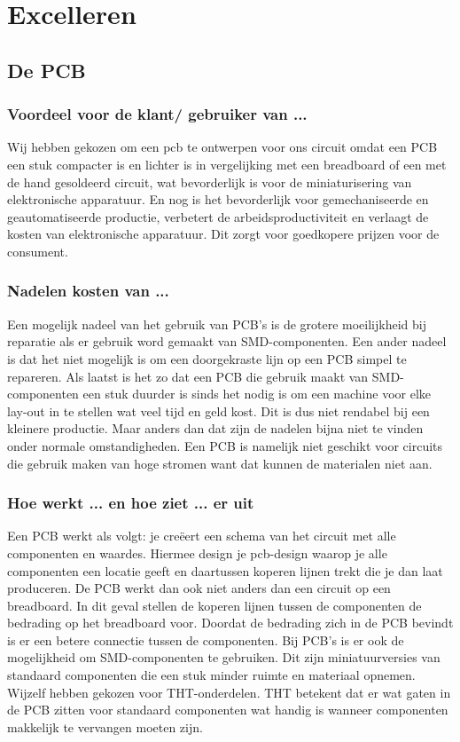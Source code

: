 \section{Excelleren}
\subsection{De PCB}
\subsubsection{Voordeel voor de klant/ gebruiker van ...}
Wij hebben gekozen om een pcb te ontwerpen voor ons circuit omdat een PCB een stuk compacter is en lichter is in vergelijking met een breadboard of een met de hand gesoldeerd circuit, wat bevorderlijk is voor de miniaturisering van elektronische apparatuur. En nog is het bevorderlijk voor gemechaniseerde en geautomatiseerde productie, verbetert de arbeidsproductiviteit en verlaagt de kosten van elektronische apparatuur. Dit zorgt voor goedkopere prijzen voor de consument.  

\subsubsection{Nadelen kosten van ...}
Een mogelijk nadeel van het gebruik van PCB's is de grotere moeilijkheid bij reparatie als er gebruik word gemaakt van SMD-componenten. Een ander nadeel is dat het niet mogelijk is om een doorgekraste lijn op een PCB simpel te repareren. Als laatst is het zo dat een PCB die gebruik maakt van SMD-componenten een stuk duurder is sinds het nodig is om een machine voor elke lay-out in te stellen wat veel tijd en geld kost. Dit is dus niet rendabel bij een kleinere productie. Maar anders dan dat zijn de nadelen bijna niet te vinden onder normale omstandigheden. Een PCB is namelijk niet geschikt voor circuits die gebruik maken van hoge stromen want dat kunnen de materialen niet aan. 



\subsubsection{Hoe werkt ... en hoe ziet ... er uit}
Een PCB werkt als volgt: je creëert een schema van het circuit met alle componenten en waardes. Hiermee design je pcb-design waarop je alle componenten een locatie geeft en daartussen koperen lijnen trekt die je dan laat produceren. De PCB werkt dan ook niet anders dan een circuit op een breadboard. In dit geval stellen de koperen lijnen tussen de componenten de bedrading op het breadboard voor. Doordat de bedrading zich in de PCB bevindt is er een betere connectie tussen de componenten.  Bij PCB's is er ook de mogelijkheid om SMD-componenten te gebruiken. Dit zijn miniatuurversies van standaard componenten die een stuk minder ruimte en materiaal opnemen. Wijzelf hebben gekozen voor THT-onderdelen. THT betekent dat er wat gaten in de PCB zitten voor standaard componenten wat handig is wanneer componenten makkelijk te vervangen moeten zijn.

